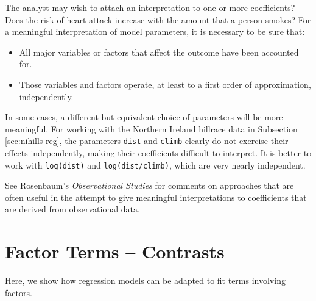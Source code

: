 \documentclass{tufte-book}\usepackage[]{graphicx}\usepackage[]{color}
\begin{document}
The analyst may wish to attach an interpretation to one or more
coefficients?  Does the risk of heart attack increase with the amount
that a person smokes?  For a meaningful interpretation of model
parameters, it is necessary to be sure that:
\begin{itemize}
\item All major variables or factors that affect the outcome have been
  accounted for.
\item Those variables and factors operate, at least to a first
order of approximation, independently.
\end{itemize}

In some cases, a different but equivalent choice of parameters will be
more meaningful.  For working with the Northern Ireland hillrace data
in Subsection \ref{sec:nihills-reg}, the parameters \texttt{dist} and
\texttt{climb} clearly do not exercise their effects independently,
making their coefficients difficult to interpret. It is better to work
with \texttt{log(dist)} and \texttt{log(dist/climb)}, which are very
nearly independent.

See Rosenbaum's {\em Observational Studies} for comments on approaches
that are often useful in the attempt to give meaningful
interpretations to coefficients that are derived from observational
data.

\section{Factor Terms -- Contrasts}\label{ss:facs}

Here, we show how regression models can
be adapted to fit terms involving factors.
\end{document}
